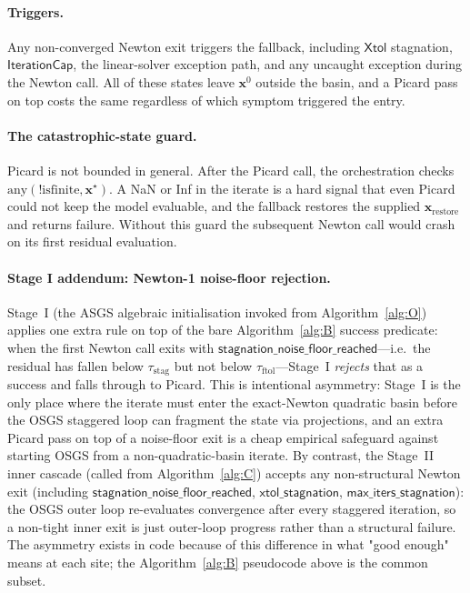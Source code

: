 \documentclass{article}
\newcommand{\textftol}{\tau_{\mathrm{ftol}}}
\newcommand{\textstag}{\tau_{\mathrm{stag}}}
\begin{document}
\paragraph{Triggers.}  Any non-converged Newton exit triggers the
fallback, including $\mathsf{Xtol}$ stagnation, $\mathsf{IterationCap}$,
the linear-solver exception path, and any uncaught exception during
the Newton call. All of these states leave $\boldsymbol{x}^0$ outside
the basin, and a Picard pass on top costs the same regardless of which
symptom triggered the entry.

\paragraph{The catastrophic-state guard.}  Picard is not bounded in
general. After the Picard call, the orchestration checks
$\mathrm{any}(!\mathrm{isfinite}, \boldsymbol{x}^\star)$. A NaN or Inf
in the iterate is a hard signal that even Picard could not keep the
model evaluable, and the fallback restores the supplied
$\boldsymbol{x}_{\mathrm{restore}}$ and returns failure. Without this
guard the subsequent Newton call would crash on its first residual
evaluation.

\paragraph{Stage I addendum: Newton-1 noise-floor rejection.}  Stage~I
(the ASGS algebraic initialisation invoked from Algorithm~\ref{alg:O})
applies one extra rule on top of the bare Algorithm~\ref{alg:B} success
predicate: when the first Newton call exits with
$\mathsf{stagnation\_noise\_floor\_reached}$---i.e.\ the residual has
fallen below $\textstag$ but not below $\textftol$---Stage~I
\emph{rejects} that as a success and falls through to Picard. This
is intentional asymmetry: Stage~I is the only place where the iterate
must enter the exact-Newton quadratic basin before the OSGS staggered
loop can fragment the state via projections, and an extra Picard pass
on top of a noise-floor exit is a cheap empirical safeguard against
starting OSGS from a non-quadratic-basin iterate. By contrast, the
Stage~II inner cascade (called from Algorithm~\ref{alg:C}) accepts any
non-structural Newton exit (including $\mathsf{stagnation\_noise\_floor\_reached}$,
$\mathsf{xtol\_stagnation}$, $\mathsf{max\_iters\_stagnation}$): the
OSGS outer loop re-evaluates convergence after every staggered
iteration, so a non-tight inner exit is just outer-loop progress
rather than a structural failure. The asymmetry exists in code
because of this difference in what "good enough" means at each site;
the Algorithm~\ref{alg:B} pseudocode above is the common subset.
\end{document}
